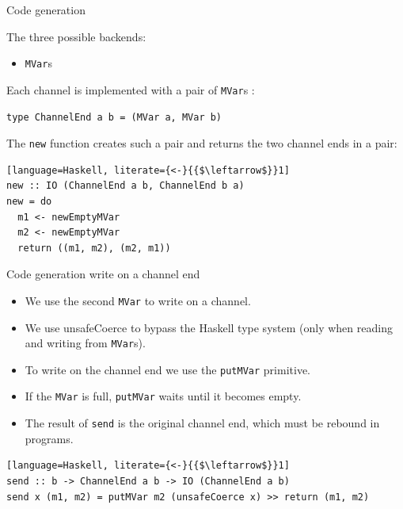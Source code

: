 \documentclass[10pt]{beamer}
\begin{document}
\begin{frame}[fragile]{Code generation}

\begin{tcolorbox}
	The three possible backends:
	\begin{itemize}
		\item \lstinline|MVar|s
	\end{itemize}	
\end{tcolorbox}

Each channel is implemented with a pair of \lstinline|MVar|s	:
\begin{lstlisting}
type ChannelEnd a b = (MVar a, MVar b)
\end{lstlisting}

\pause
The \lstinline|new| function creates such a pair and returns the two
channel ends in a pair:

\begin{lstlisting}[language=Haskell, literate={<-}{{$\leftarrow$}}1]
new :: IO (ChannelEnd a b, ChannelEnd b a)
new = do
  m1 <- newEmptyMVar
  m2 <- newEmptyMVar
  return ((m1, m2), (m2, m1))
\end{lstlisting}
\end{frame}

\begin{frame}[fragile]{Code generation \hfill {\color{mLightBrown} write on a channel end}}

\begin{tcolorbox}
\begin{itemize}
	\item We use the second \lstinline|MVar| to write on a channel. \pause
	\item We use unsafeCoerce to bypass the Haskell type system (only when reading and writing from \lstinline|MVar|s). \pause
	\item To write on the channel end we use the \lstinline|putMVar| primitive. \pause
	\item If the \lstinline|MVar| is full, \lstinline|putMVar| waits until it becomes empty. \pause
	\item The
result of \lstinline|send| is the original channel end, which must be
rebound in programs. 
\end{itemize}
\end{tcolorbox}

\pause
\begin{lstlisting}[language=Haskell, literate={<-}{{$\leftarrow$}}1]
send :: b -> ChannelEnd a b -> IO (ChannelEnd a b)
send x (m1, m2) = putMVar m2 (unsafeCoerce x) >> return (m1, m2)
\end{lstlisting}

\end{frame}
\end{document}
